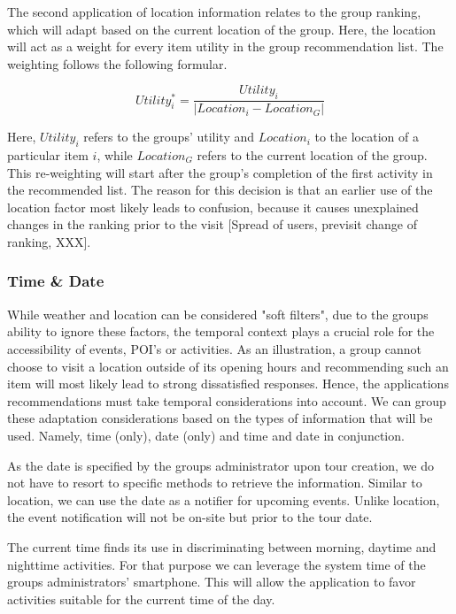 \documentclass[11pt,a4paper,oneside]{article}
\begin{document}
The second application of location information relates to the group ranking, which will adapt based on the current location of the group. Here, the location will act as a weight for every item utility in the group recommendation list. The weighting follows the following formular.

\begin{equation}
    Utility_{i}^* = \frac{Utility_i}{\lvert Location_i - Location_G \rvert}
\end{equation}

Here, $Utility_i$ refers to the groups' utility and $Location_i$ to the location of a particular item $i$, while $Location_G$ refers to the current location of the group. This re-weighting will start after the group's completion of the first activity in the recommended list. The reason for this decision is that an earlier use of the location factor most likely leads to confusion, because it causes unexplained changes in the ranking prior to the visit [Spread of users, previsit change of ranking, XXX]. 


\subsubsection{Time \& Date}
While weather and location can be considered "soft filters", due to the groups ability to ignore these factors, the temporal context plays a crucial role for the accessibility of events, POI's or activities. As an illustration, a group cannot choose to visit a location outside of its opening hours and recommending such an item will most likely lead to strong dissatisfied responses. Hence, the applications recommendations must take temporal considerations into account. We can group these adaptation considerations based on the types of information that will be used. Namely, time (only), date (only) and time and date in conjunction. 

As the date is specified by the groups administrator upon tour creation, we do not have to resort to specific methods to retrieve the information. Similar to location, we can use the date as a notifier for upcoming events. Unlike location, the event notification will not be on-site but prior to the tour date.

The current time finds its use in discriminating between morning, daytime and nighttime activities. For that purpose we can leverage the system time of the groups administrators' smartphone. This will allow the application to favor activities suitable for the current time of the day.
\end{document}
